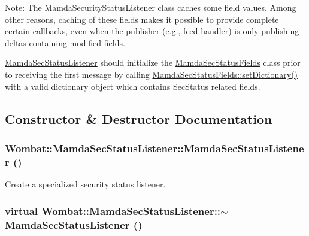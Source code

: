 Note: The Mamda\-Security\-Status\-Listener class caches some field values. Among other reasons, caching of these fields makes it possible to provide complete certain callbacks, even when the publisher (e.g., feed handler) is only publishing deltas containing modified fields.

\hyperlink{classWombat_1_1MamdaSecStatusListener}{Mamda\-Sec\-Status\-Listener} should initialize the \hyperlink{classWombat_1_1MamdaSecStatusFields}{Mamda\-Sec\-Status\-Fields} class prior to receiving the first message by calling \hyperlink{classWombat_1_1MamdaSecStatusFields_17d03af8bead7f50d20d3bef3752df39}{Mamda\-Sec\-Status\-Fields::set\-Dictionary()} with a valid dictionary object which contains Sec\-Status related fields. 



\subsection{Constructor \& Destructor Documentation}
\hypertarget{classWombat_1_1MamdaSecStatusListener_ebc08dcac4713afaa5408a6d01913067}{
\subsubsection[MamdaSecStatusListener]{\setlength{\rightskip}{0pt plus 5cm}Wombat::Mamda\-Sec\-Status\-Listener::Mamda\-Sec\-Status\-Listener ()}}
\label{classWombat_1_1MamdaSecStatusListener_ebc08dcac4713afaa5408a6d01913067}


Create a specialized security status listener. 

\hypertarget{classWombat_1_1MamdaSecStatusListener_58a353942b317d2b3a0cc1d69afcc815}{
\subsubsection[$\sim$MamdaSecStatusListener]{\setlength{\rightskip}{0pt plus 5cm}virtual Wombat::Mamda\-Sec\-Status\-Listener::$\sim$Mamda\-Sec\-Status\-Listener ()}}
\label{classWombat_1_1MamdaSecStatusListener_58a353942b317d2b3a0cc1d69afcc815}




